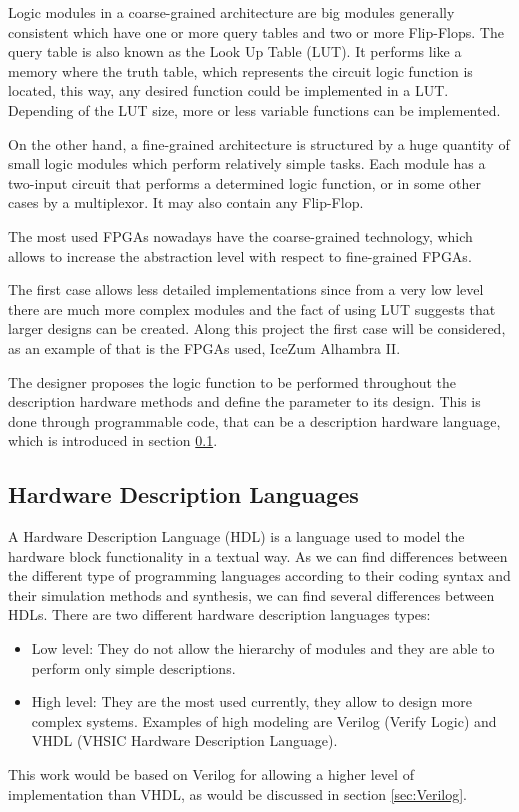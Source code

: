 Logic modules in a coarse-grained architecture are big modules generally consistent which have one or more query tables and two or more Flip-Flops. The query table is also known as the Look Up Table (LUT). It performs like a memory where the truth table, which represents the circuit logic function is located, this way, any desired function could be implemented in a LUT. Depending of the LUT size, more or less variable functions can be implemented.\newline

On the other hand, a fine-grained architecture is structured by a huge quantity of small logic modules which perform relatively simple tasks. Each module has a two-input circuit that performs a determined logic function, or in some other cases by a multiplexor. It may also contain any Flip-Flop. \newline

The most used FPGAs nowadays have the coarse-grained technology, which allows to increase the abstraction level with respect to fine-grained FPGAs. \newline

The first case allows less detailed implementations since from a very low level there are much more complex modules and the fact of using LUT suggests that larger designs can be created. Along this project the first case will be considered, as an example of that is the FPGAs used, IceZum Alhambra II.\newline

The designer proposes the logic function to be performed throughout the description hardware methods and define the parameter to its design. This is done through programmable code, that can be a description hardware language, which is introduced in section \ref{sec:DescripcionHardware}. 

\subsection{Hardware Description Languages}\label{sec:DescripcionHardware}

A Hardware Description Language\cite{HDL} (HDL) is a language used to model the hardware block functionality in a textual way. As we can find differences between the different type of programming languages according to their coding syntax and their simulation methods and synthesis, we can find several differences between HDLs. There are two different hardware description languages types:
\begin{itemize}
	\item Low level: They do not allow the hierarchy of modules and they are able to perform only simple descriptions.
	\item High level: They are the most used currently, they allow to design more complex systems. Examples of high modeling are Verilog (Verify Logic) and VHDL (VHSIC Hardware Description Language).
\end{itemize}	
This work would be based on Verilog for allowing a higher level of implementation than VHDL, as would be discussed in section \ref{sec:Verilog}. \newline

